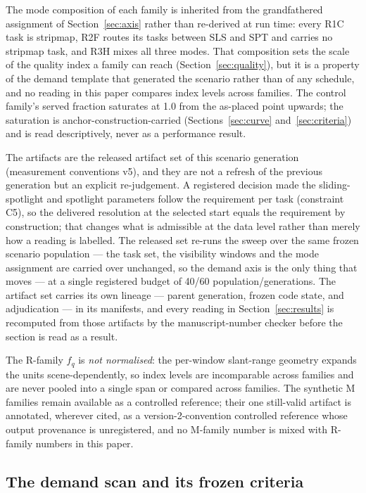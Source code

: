 \documentclass[preprint,authoryear]{elsarticle}
\begin{document}
The mode composition of each family is inherited from the grandfathered assignment of Section~\ref{sec:axis} rather than re-derived at run time: every R1C task is stripmap, R2F routes its tasks between SLS and SPT and carries no stripmap task, and R3H mixes all three modes. That composition sets the scale of the quality index a family can reach (Section~\ref{sec:quality}), but it is a property of the demand template that generated the scenario rather than of any schedule, and no reading in this paper compares index levels across families. The control family's served fraction saturates at 1.0 from the as-placed point upwards; the saturation is anchor-construction-carried (Sections~\ref{sec:curve} and~\ref{sec:criteria}) and is read descriptively, never as a performance result.

The artifacts are the released artifact set of this scenario generation (measurement conventions v5), and they are not a refresh of the previous generation but an explicit re-judgement. A registered decision made the sliding-spotlight and spotlight parameters follow the requirement per task (constraint C5), so the delivered resolution at the selected start equals the requirement by construction; that changes what is admissible at the data level rather than merely how a reading is labelled. The released set re-runs the sweep over the same frozen scenario population --- the task set, the visibility windows and the mode assignment are carried over unchanged, so the demand axis is the only thing that moves --- at a single registered budget of 40/60 population/generations. The artifact set carries its own lineage --- parent generation, frozen code state, and adjudication --- in its manifests, and every reading in Section~\ref{sec:results} is recomputed from those artifacts by the manuscript-number checker before the section is read as a result.

The R-family $f_q$ is \emph{not normalised}: the per-window slant-range geometry expands the units scene-dependently, so index levels are incomparable across families and are never pooled into a single span or compared across families. The synthetic M families remain available as a controlled reference; their one still-valid artifact is annotated, wherever cited, as a version-2-convention controlled reference whose output provenance is unregistered, and no M-family number is mixed with R-family numbers in this paper.

\subsection{The demand scan and its frozen criteria}\label{sec:hypotheses}
\end{document}
